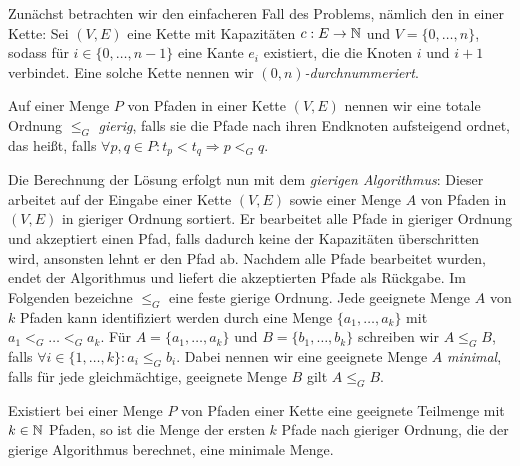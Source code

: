 Zunächst betrachten wir den einfacheren Fall des Problems, nämlich den in einer Kette:
   Sei $(V,E)$ eine Kette mit Kapazitäten $c: E \to \mathbb N$ und $V=\{0,\dots,n\}$, sodass für $i \in \{0,\dots,n-1\}$
   eine Kante $e_i$ existiert, die die Knoten $i$ und $i+1$ verbindet.
   Eine solche Kette nennen wir {\em $(0, n)$-durchnummeriert}.
   \begin{definition}
       Auf einer Menge $P$ von Pfaden in einer Kette $(V,E)$ nennen wir eine totale Ordnung $\leq_G$ {\em gierig},
       falls sie die Pfade nach ihren Endknoten aufsteigend ordnet, das heißt, falls
       $\forall p, q \in P \colon t_p < t_q \Rightarrow p <_G q$.
   \end{definition}
   Die Berechnung der Lösung erfolgt nun mit dem {\em gierigen Algorithmus}: Dieser arbeitet auf der Eingabe einer
   Kette $(V,E)$ sowie einer Menge $A$ von Pfaden in $(V,E)$ in gieriger Ordnung sortiert.
   Er bearbeitet alle Pfade in gieriger Ordnung und akzeptiert einen Pfad, falls dadurch keine der Kapazitäten
   überschritten wird, ansonsten lehnt er den Pfad ab.
   Nachdem alle Pfade bearbeitet wurden, endet der Algorithmus und liefert die akzeptierten Pfade als Rückgabe.
   Im Folgenden bezeichne $\leq_G$ eine feste gierige Ordnung.
   Jede geeignete Menge $A$ von $k$ Pfaden kann identifiziert werden durch eine Menge $\{a_1, \dots, a_k\}$ mit
   $a_1 <_G \dots <_G a_k$.
   Für $A=\{a_1,\dots,a_k\}$ und $B=\{b_1,\dots,b_k\}$ schreiben wir $A \leq_G B$, falls $\forall i \in \{1,\dots,k\}\colon a_i \leq_G b_i$.
   Dabei nennen wir eine geeignete Menge $A$ {\em minimal}, falls für jede gleichmächtige, geeignete Menge $B$
   gilt $A \leq_G B$.
   \begin{lemma}\label{greedy-algorithm}
       Existiert bei einer Menge $P$ von Pfaden einer Kette eine geeignete Teilmenge mit $k \in \mathbb N$ Pfaden, so ist die
       Menge der ersten $k$ Pfade nach gieriger Ordnung, die der gierige Algorithmus berechnet, eine minimale Menge.
   \end{lemma}
